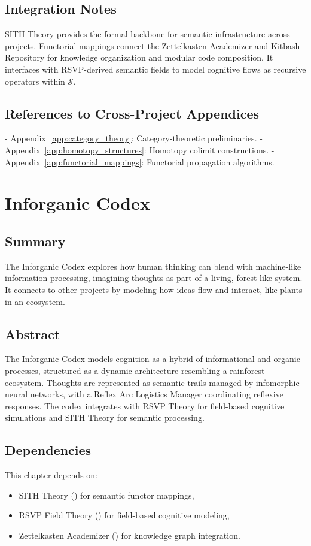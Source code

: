 \documentclass[11pt,oneside]{memoir}
\theoremstyle{plain}
\newcommand{\Sfun}{\mathcal{S}}
\begin{document}
\section{Integration Notes}
SITH Theory provides the formal backbone for semantic infrastructure across projects. Functorial mappings connect the Zettelkasten Academizer and Kitbash Repository for knowledge organization and modular code composition. It interfaces with RSVP-derived semantic fields to model cognitive flows as recursive operators within \(\Sfun\).

\section{References to Cross-Project Appendices}
- Appendix~\ref{app:category_theory}: Category-theoretic preliminaries.
- Appendix~\ref{app:homotopy_structures}: Homotopy colimit constructions.
- Appendix~\ref{app:functorial_mappings}: Functorial propagation algorithms.

\chapter{Inforganic Codex}
\label{sec:inforganic_codex}
\section{Summary}
The Inforganic Codex explores how human thinking can blend with machine-like information processing, imagining thoughts as part of a living, forest-like system. It connects to other projects by modeling how ideas flow and interact, like plants in an ecosystem.

\section{Abstract}
The Inforganic Codex models cognition as a hybrid of informational and organic processes, structured as a dynamic architecture resembling a rainforest ecosystem. Thoughts are represented as semantic trails managed by infomorphic neural networks, with a Reflex Arc Logistics Manager coordinating reflexive responses. The codex integrates with RSVP Theory for field-based cognitive simulations and SITH Theory for semantic processing.

\section{Dependencies}
This chapter depends on:
\begin{itemize}
    \item SITH Theory () for semantic functor mappings,
    \item RSVP Field Theory () for field-based cognitive modeling,
    \item Zettelkasten Academizer () for knowledge graph integration.
\end{itemize}
\end{document}
